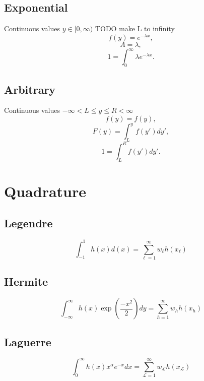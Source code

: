 \documentclass[11pt]{article}
\begin{document}
\subsection{Exponential}
Continuous values $y\in[0,\infty)$ TODO make L to infinity
\begin{equation}
f(y)=e^{-\lambda x},
\end{equation}
\begin{equation}
A=\lambda,
\end{equation}
\begin{equation}
1=\int_0^\infty \lambda e^{-\lambda x}.
\end{equation}

\subsection{Arbitrary}
Continuous values $-\infty < L \leq y \leq R < \infty$
\begin{equation}
f(y) = f(y),
\end{equation}
\begin{equation}
F(y) = \int_{L}^y f(y')dy',
\end{equation}
\begin{equation}
1 = \int_{L}^R f(y')dy'. 
\end{equation}


\section{Quadrature}
\subsection{Legendre}
\begin{equation}
 \int_{-1}^1 h(x)d(x) = \sum_{\ell=1}^\infty w_\ell h(x_\ell)
\end{equation}

\subsection{Hermite}
\begin{equation}
\int_{-\infty}^\infty h(x)\exp(\frac{-x^2}{2})dy = \sum_{h=1}^\infty w_h h(x_h)
\end{equation}

\subsection{Laguerre}
\begin{equation}
\int_0^\infty h(x) x^\alpha e^{-x} dx = \sum_{\mathcal{L}=1}^\infty w_\mathcal{L} h(x_\mathcal{L})
\end{equation}
\end{document}
